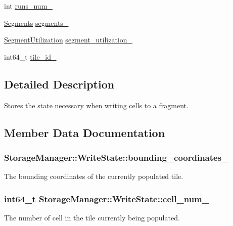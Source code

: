 \begin{DoxyCompactItemize}
int \hyperlink{structStorageManager_1_1WriteState_a2b66823e9497d9ffdbc4513f5aae4da0}{runs\+\_\+num\+\_\+}
\item 
\hyperlink{classStorageManager_ac40d6aec2ad9e7e4ecc7c765628dccb1}{Segments} \hyperlink{structStorageManager_1_1WriteState_a988a87b69e8faeacc8aeb3d705bc0d01}{segments\+\_\+}
\item 
\hyperlink{classStorageManager_a0a8bdd342987076d7d89da3e36f926d0}{Segment\+Utilization} \hyperlink{structStorageManager_1_1WriteState_a49054392be593764becbff60881c6f70}{segment\+\_\+utilization\+\_\+}
\item 
int64\+\_\+t \hyperlink{structStorageManager_1_1WriteState_a3dd377d4143a3f30f8127b6675818aad}{tile\+\_\+id\+\_\+}
\end{DoxyCompactItemize}


\subsection{Detailed Description}
Stores the state necessary when writing cells to a fragment. 

\subsection{Member Data Documentation}
\hypertarget{structStorageManager_1_1WriteState_a064ab2412c1f90d76c54282d6652335f}{}
\subsubsection[{bounding\+\_\+coordinates\+\_\+}]{ Storage\+Manager\+::\+Write\+State\+::bounding\+\_\+coordinates\+\_\+}\label{structStorageManager_1_1WriteState_a064ab2412c1f90d76c54282d6652335f}
The bounding coordinates of the currently populated tile. \hypertarget{structStorageManager_1_1WriteState_ad77bd2f8243f610ac81cd53a5bfd0447}{}
\subsubsection[{cell\+\_\+num\+\_\+}]{\setlength{\rightskip}{0pt plus 5cm}int64\+\_\+t Storage\+Manager\+::\+Write\+State\+::cell\+\_\+num\+\_\+}\label{structStorageManager_1_1WriteState_ad77bd2f8243f610ac81cd53a5bfd0447}
The number of cell in the tile currently being populated. \hypertarget{structStorageManager_1_1WriteState_a5a6dfa8165c9591f51d383e4a45b2895}{}
